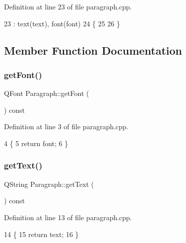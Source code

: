 Definition at line 23 of file paragraph.\+cpp.


\begin{DoxyCode}
23                                              : text(text), font(font)
24 \{
25 
26 \}
\end{DoxyCode}


\subsection{Member Function Documentation}
\mbox{\label{class_paragraph_abc3bbbf36f4318623d483190b30e08a9}} 
\subsubsection{\texorpdfstring{get\+Font()}{getFont()}}
{\footnotesize\ttfamily Q\+Font Paragraph\+::get\+Font (\begin{DoxyParamCaption}{ }\end{DoxyParamCaption}) const}



Definition at line 3 of file paragraph.\+cpp.


\begin{DoxyCode}
4 \{
5     \textcolor{keywordflow}{return} font;
6 \}
\end{DoxyCode}
\mbox{\label{class_paragraph_aa05a7f3553a718ee03b4df6fdcd35d1a}} 
\subsubsection{\texorpdfstring{get\+Text()}{getText()}}
{\footnotesize\ttfamily Q\+String Paragraph\+::get\+Text (\begin{DoxyParamCaption}{ }\end{DoxyParamCaption}) const}



Definition at line 13 of file paragraph.\+cpp.


\begin{DoxyCode}
14 \{
15     \textcolor{keywordflow}{return} text;
16 \}
\end{DoxyCode}
\mbox{\label{class_paragraph_ac1b3f012dcb54c04c252a48fda13a9fd}} 
